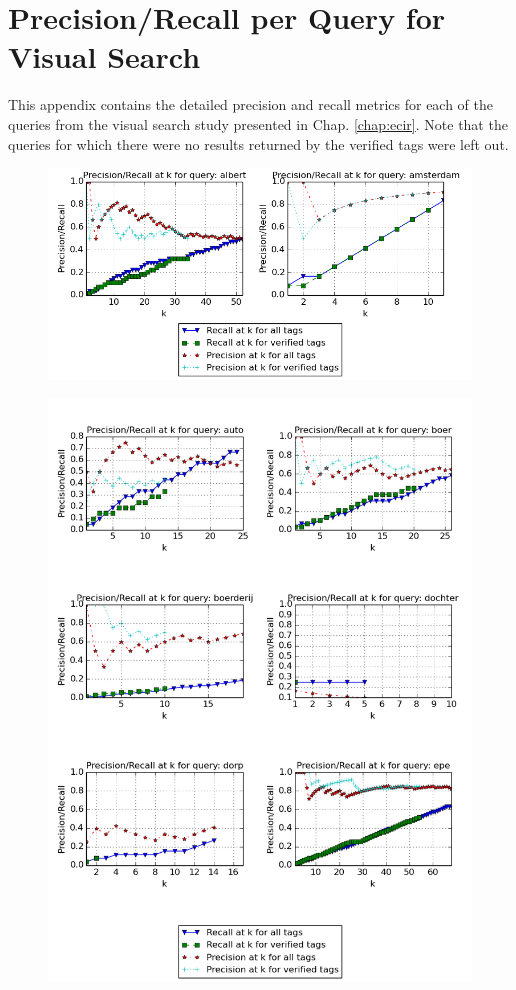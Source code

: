 \chapter{Precision/Recall per Query for Visual Search}\label{appen:prec-recall}
This appendix contains the detailed precision and recall metrics for each of the queries from the visual search study presented in Chap. \ref{chap:ecir}. Note that the queries for which there were no results returned by the verified tags were left out.

\begin{figure}[H]
\centering
\includegraphics[width=\textwidth]{appendixa/queries1}
\end{figure}

\begin{figure}[H]
\centering
\includegraphics[width=\textwidth]{appendixa/queries3}
\end{figure}

